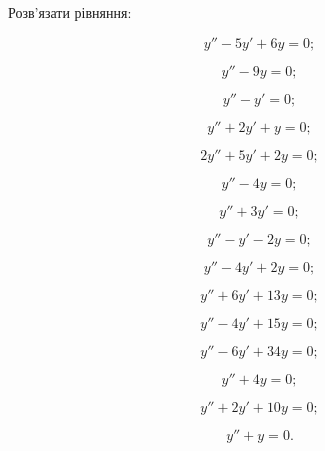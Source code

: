 Розв’язати рівняння:
\begin{multicols}{2}
\begin{problem}
	\[y''-5y'+6y=0;\]
\end{problem}
\begin{problem}
	\[y''-9y=0;\]
\end{problem}
\begin{problem}
	\[y''-y'=0;\]
\end{problem}
\begin{problem}
	\[y''+2y'+y=0;\]
\end{problem}
\begin{problem}
	\[2y''+5y'+2y=0;\]
\end{problem}
\begin{problem}
	\[y''-4y=0;\]
\begin{problem}
	\[y''+3y'=0;\]
\end{problem}
\end{problem}
\begin{problem}
	\[y''-y'-2y=0;\]
\end{problem}
\begin{problem}
	\[y''-4y'+2y=0;\]
\end{problem}
\begin{problem}
	\[y''+6y'+13y=0;\]
\end{problem}
\begin{problem}
	\[y''-4y'+15y=0;\]
\end{problem}
\begin{problem}
	\[y''-6y'+34y=0;\]
\end{problem}
\begin{problem}
	\[y''+4y=0;\]
\end{problem}
\begin{problem}
	\[y''+2y'+10y=0;\]
\end{problem}
\begin{problem}
	\[y''+y=0.\]
\end{problem}
\end{multicols}

